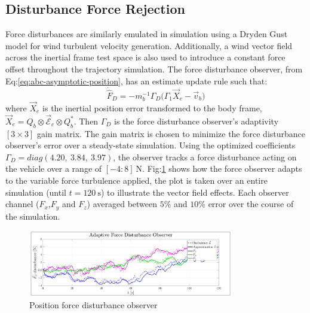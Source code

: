 \subsection{Disturbance Force Rejection}
\label{subsec:simulation.disturbance.force}
Force disturbances are similarly emulated in simulation using a Dryden Gust model for wind turbulent velocity generation. Additionally, a wind vector field across the inertial frame test space is also used to introduce a constant force offset throughout the trajectory simulation. The force disturbance observer, from Eq:\ref{eq:abc-asymptotic-position}, has an estimate update rule such that:
\begin{equation}
\dot{\hat{F}}_D=-m_b^{-1}\Gamma_D\Big(\Gamma_1\vec{X}_e-\vec{v}_b\Big)
\end{equation}
where $\vec{X}_e$ is the inertial position error transformed to the body frame, $\vec{X}_e=Q_b\otimes\vec{\mathcal{E}}_e\otimes Q_b^*$. Then $\Gamma_D$ is the force disturbance observer's adaptivity $[3\times 3]$ gain matrix. The gain matrix is chosen to minimize the force disturbance observer's error over a steady-state simulation. Using the optimized coefficients $\Gamma_D=diag(4.20,~3.84,~3.97)$, the observer tracks a force disturbance acting on the vehicle over a range of $[-4:8]~\text{N}$. Fig:\ref{fig:force-observer} shows how the force observer adapts to the variable force turbulence applied, the plot is taken over an entire simulation (until $t=120~\text{s}$) to illustrate the vector field effects. Each observer channel ($F_x$,$F_y$ and $F_z$) averaged between $5\%$ and $10\%$ error over the course of the simulation.
\begin{figure}[hbtp]
\vspace{-6pt}
\centering
\includegraphics[width=0.8\textwidth]{graphs/force-observer}
\vspace{-10pt}
\caption{Position force disturbance observer}
\label{fig:force-observer}
\vspace{-18pt}
\end{figure}
\par
